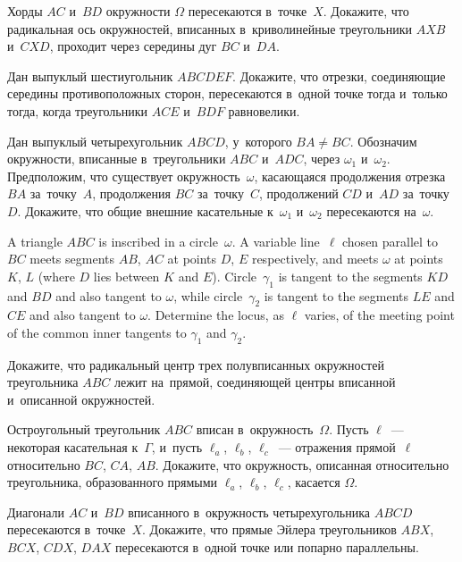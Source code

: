 


\begin{problems}

\item
Хорды $AC$ и~$BD$ окружности $\Omega$ пересекаются в~точке~$X$.
Докажите, что радикальная ось окружностей, вписанных в~криволинейные
треугольники $AXB$ и~$CXD$, проходит через середины дуг $BC$ и~$DA$.

\item
Дан выпуклый шестиугольник $ABCDEF$.
Докажите, что отрезки, соединяющие середины  противоположных сторон,
пересекаются в~одной точке тогда и~только тогда, когда треугольники $ACE$
и~$BDF$ равновелики.

\item
Дан выпуклый четырехугольник $ABCD$, у~которого $BA \neq BC$.
Обозначим окружности, вписанные в~треугольники $ABC$ и~$ADC$, через
$\omega_1$ и~$\omega_2$.
Предположим, что существует окружность~$\omega$, касающаяся продолжения
отрезка~$BA$ за~точку~$A$, продолжения $BC$ за~точку~$C$,
продолжений $CD$ и~$AD$ за~точку~$D$.
Докажите, что общие внешние касательные к~$\omega_1$ и~$\omega_2$ пересекаются
на~$\omega$.

\item
A triangle $ABC$ is inscribed in a circle~$\omega$.
A variable line~$\ell$ chosen parallel to $BC$ meets segments $AB$, $AC$ at
points $D$, $E$ respectively, and meets $\omega$ at points $K$, $L$
(where $D$ lies between $K$ and $E$).
Circle~$\gamma_1$ is tangent to the segments $KD$ and $BD$ and also tangent
to $\omega$, while circle~$\gamma_2$ is tangent to the segments $LE$ and $CE$
and also tangent to $\omega$.
Determine the locus, as $\ell$ varies, of the meeting point of the common inner
tangents to $\gamma_1$ and $\gamma_2$.

\item
Докажите, что радикальный центр трех полувписанных окружностей
треугольника $ABC$ лежит на~прямой, соединяющей центры вписанной и~описанной
окружностей.

\item
Остроугольный треугольник $ABC$ вписан в~окружность~$\Omega$.
Пусть $\ell$~--- некоторая касательная к~$\Gamma$, и~пусть
$\ell_{a}$, $\ell_{b}$, $\ell_{c}$~--- отражения прямой~$\ell$
относительно $BC$, $CA$, $AB$.
Докажите, что окружность, описанная относительно треугольника, образованного
прямыми $\ell_{a}$, $\ell_{b}$, $\ell_{c}$, касается $\Omega$.

\item
Диагонали $AC$ и~$BD$ вписанного в~окружность четырехугольника $ABCD$
пересекаются в~точке~$X$.
Докажите, что прямые Эйлера треугольников $ABX$, $BCX$, $CDX$, $DAX$
пересекаются в~одной точке или попарно параллельны.

\end{problems}

